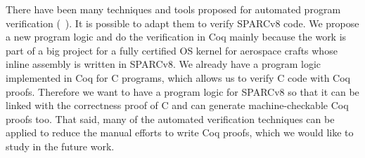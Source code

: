There have been many techniques and tools proposed for automated
program verification (\eg~\cite{SymbolicExecutionSpLogic,Smallfoot}).
It is possible to adapt them to verify SPARCv8 code.
We propose a new program logic and do the verification in Coq mainly
because the work is part of a big project for a fully certified OS
kernel for aerospace crafts whose inline assembly is written in
SPARCv8. We already have a program logic implemented in Coq for
C programs, which allows us to verify C code with Coq proofs.
Therefore we want to have a program logic for SPARCv8 so that
it can be linked with the correctness proof of
C and can generate machine-checkable Coq proofs too.
That said, many of the automated verification techniques can
be applied to reduce the manual efforts to write Coq proofs,
which we would like to study in the future work.



